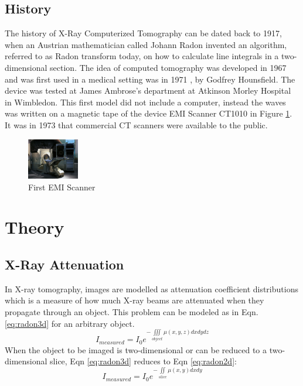 \documentclass[journal]{IEEEtran}
\begin{document}
\subsection{History}
The history of X-Ray Computerized Tomography can be dated back to 1917, when an Austrian mathematician called Johann Radon invented an algorithm, referred to as Radon transform today, on how to calculate line integrals in a two-dimensional section. The idea of computed tomography was developed in 1967 and was first used in a medical setting was in 1971 \cite{richmond2004sir}, by Godfrey Hounsfield. The device was tested at
James Ambrose’s department at Atkinson Morley Hospital in Wimbledon. This first model did not include a computer, instead the waves was written on a magnetic tape of the device EMI Scanner CT1010 in Figure \ref{fig:CT1010}. It was in 1973 that commercial CT scanners were available to the public. \cite{CTHist}

\begin{figure}[h]
\centering
\includegraphics[width=0.2\textwidth]{images/CT.jpg}
\caption{First EMI Scanner \cite{emict}}\label{fig:CT1010}
\end{figure}

\vfill{\null}

\section{Theory} \label{sec:theory}
\subsection{X-Ray Attenuation}
In X-ray tomography, images are modelled as attenuation coefficient distributions which is a measure of how much X-ray beams are attenuated when they propagate through an object. This problem can be modeled as in Eqn. \ref{eq:radon3d} for an arbitrary object.
\begin{equation} 
	I_{measured} = I_0 e^{-\iiint\limits_{object}\mu(x,y,z)dxdydz}
	\label{eq:radon3d}
\end{equation}
When the object to be imaged is two-dimensional or can be reduced to a two-dimensional slice, Eqn \ref{eq:radon3d} reduces to Eqn \ref{eq:radon2d}:
\begin{equation}
	I_{measured} = I_0 e^{-\iint\limits_{slice}\mu(x,y)dxdy}
	\label{eq:radon2d}
\end{equation}
\end{document}

